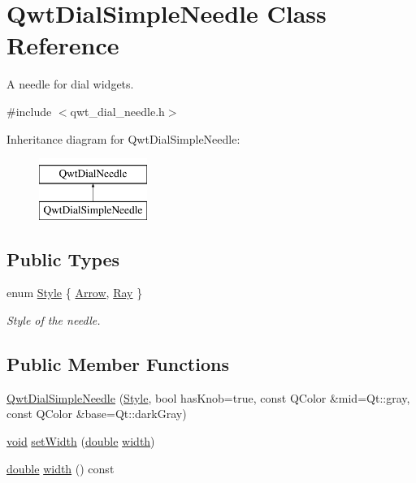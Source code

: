 \hypertarget{class_qwt_dial_simple_needle}{\section{Qwt\-Dial\-Simple\-Needle Class Reference}
\label{class_qwt_dial_simple_needle}
}


A needle for dial widgets.  




{\ttfamily \#include $<$qwt\-\_\-dial\-\_\-needle.\-h$>$}

Inheritance diagram for Qwt\-Dial\-Simple\-Needle\-:\begin{figure}[H]
\begin{center}
\leavevmode
\includegraphics[height=2.000000cm]{class_qwt_dial_simple_needle}
\end{center}
\end{figure}
\subsection*{Public Types}
\begin{DoxyCompactItemize}
\item 
enum \hyperlink{class_qwt_dial_simple_needle_ad28821489e04f1fd942e5bebc8a60584}{Style} \{ \hyperlink{class_qwt_dial_simple_needle_ad28821489e04f1fd942e5bebc8a60584a27ace220f0a5c6abd061c85bbdc9a663}{Arrow}, 
\hyperlink{class_qwt_dial_simple_needle_ad28821489e04f1fd942e5bebc8a60584a580980e68ef26fc7d35962cf6f12a4b2}{Ray}
 \}
\begin{DoxyCompactList}\small\item\em Style of the needle. \end{DoxyCompactList}\end{DoxyCompactItemize}
\subsection*{Public Member Functions}
\begin{DoxyCompactItemize}
\item 
\hyperlink{class_qwt_dial_simple_needle_a5f16b9298ecd293360a3ccf91d3dbfbb}{Qwt\-Dial\-Simple\-Needle} (\hyperlink{class_qwt_dial_simple_needle_ad28821489e04f1fd942e5bebc8a60584}{Style}, bool has\-Knob=true, const Q\-Color \&mid=Qt\-::gray, const Q\-Color \&base=Qt\-::dark\-Gray)
\item 
\hyperlink{group___u_a_v_objects_plugin_ga444cf2ff3f0ecbe028adce838d373f5c}{void} \hyperlink{class_qwt_dial_simple_needle_ad7672543371e38c864e44d9240271c22}{set\-Width} (\hyperlink{_super_l_u_support_8h_a8956b2b9f49bf918deed98379d159ca7}{double} \hyperlink{glext_8h_a76aaa5c50746272e7d2de9aece921757}{width})
\item 
\hyperlink{_super_l_u_support_8h_a8956b2b9f49bf918deed98379d159ca7}{double} \hyperlink{class_qwt_dial_simple_needle_af7c8d5ed409364e4e67b7e40f1c0cfe2}{width} () const 
\end{DoxyCompactItemize}
